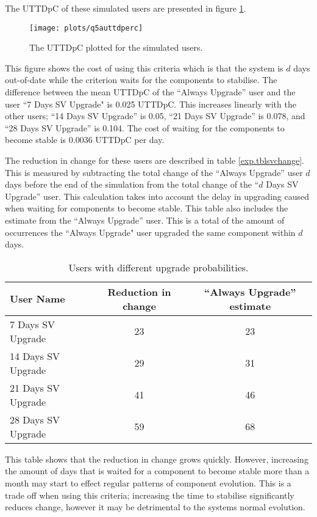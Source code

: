 The UTTDpC of these simulated users are presented in figure \ref{exp.q5auttdperc}.
\begin{figure}[htp]
\begin{center}
  \texttt{[image: plots/q5auttdperc]}
  \caption{The UTTDpC plotted for the simulated users.}
  \label{exp.q5auttdperc}
\end{center}
\end{figure}

This figure shows the cost of using this criteria which is that the system is $d$ days out-of-date while the criterion waits for the components to stabilise.
The difference between the mean UTTDpC of the ``Always Upgrade'' user and the user ``7 Days SV Upgrade" is 0.025 UTTDpC.
This increases linearly with the other users; ``14 Days SV Upgrade'' is 0.05, ``21 Days SV Upgrade'' is 0.078, and ``28 Days SV Upgrade'' is 0.104.
The cost of waiting for the components to become stable is 0.0036 UTTDpC per day.

The reduction in change for these users are described in table \ref{exp.tblsvchange}.
This is measured by subtracting the total change of the ``Always Upgrade'' user $d$ days before the end of the simulation
from the total change of the  ``$d$ Days SV Upgrade'' user.
This calculation takes into account the delay in upgrading caused when waiting for components to become stable.
This table also includes the estimate from the ``Always Upgrade'' user.
This is a total of the amount of occurrences the ``Always Upgrade" user upgraded the same component within $d$ days.
\begin{table}[h!]
\centering
\begin{tabular}{|l | c | c | }
\hline
User Name 				& Reduction in change 	& ``Always Upgrade'' estimate		\\ \hline
7 Days SV Upgrade		& 23 					& 23 			 \\
14 Days SV Upgrade		& 29	 				& 31			\\
21 Days SV Upgrade		& 41 					& 46 			 \\
28 Days SV Upgrade 		& 59 					& 68			\\ \hline
\end{tabular}
\caption{Users with different upgrade probabilities.}
\label{exp.tblsvusers}
\end{table}

This table shows that the reduction in change grows quickly.
However, increasing the amount of days that is waited for a component to become stable more than a month may start to effect regular patterns of component evolution.
This is a trade off when using this criteria; increasing the time to stabilise significantly reduces change, however it may be detrimental to the systems normal evolution.

